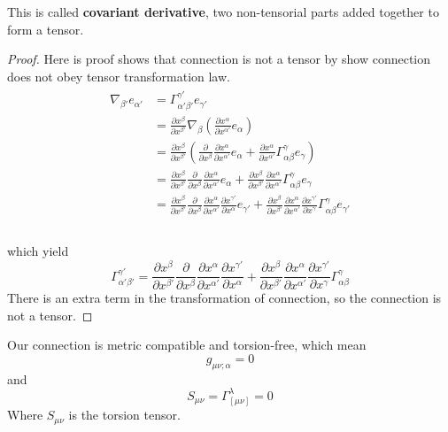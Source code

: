 \documentclass[12pt]{article}
\theoremstyle{mystyle}{\newtheorem{definition}{Definition}[section]}
\theoremstyle{mystyle}{\newtheorem{theorem}[definition]{Theorem}}
\theoremstyle{mystyle}{\newtheorem*{remark}{Remark}}
\theoremstyle{mystyle}{\newtheorem*{example}{Example}}
\theoremstyle{mystyle}{\newtheorem*{examples}{Examples}}
\theoremstyle{cstyle}{\newtheorem*{cthm}{}}
\begin{document}
This is called \textbf{covariant derivative}, two non-tensorial parts added together to form a tensor.

\begin{proof}
  Here is proof shows that connection is not a tensor by show connection does not obey tensor transformation law.
  \begin{align*}
    \begin{split}
      \nabla_{\beta'}e_{\alpha'} & = \Gamma^{\gamma'}_{\alpha'\beta'}e_{\gamma'} \\
      &= \frac{\partial x^{\beta}}{\partial x^{\beta'}}\nabla_{\beta}(\frac{\partial x^{\alpha}}{\partial x^{\alpha'}}e_{\alpha})\\
      &= \frac{\partial x^{\beta}}{\partial x^{\beta'}}
      (\frac{\partial}{\partial x^{\beta}}\frac{\partial x^{\alpha}}{\partial x^{\alpha'}}e_{\alpha}
      + \frac{\partial x^{\alpha}}{\partial x^{\alpha'}} \Gamma ^{\gamma}_{\alpha\beta} e_{\gamma})\\
      &= \frac{\partial x^{\beta}}{\partial x^{\beta'}}
      \frac{\partial}{\partial x^{\beta}}\frac{\partial x^{\alpha}}{\partial x^{\alpha'}}e_{\alpha}
      + \frac{\partial x^{\beta}}{\partial x^{\beta'}}
      \frac{\partial x^{\alpha}}{\partial x^{\alpha'}} \Gamma ^{\gamma}_{\alpha\beta} e_{\gamma}\\
      &= \frac{\partial x^{\beta}}{\partial x^{\beta'}}
      \frac{\partial}{\partial x^{\beta}}\frac{\partial x^{\alpha}}{\partial x^{\alpha'}}\frac{\partial x^{\gamma'}}{\partial x^{\alpha}}e_{\gamma'}
      + \frac{\partial x^{\beta}}{\partial x^{\beta'}}
      \frac{\partial x^{\alpha}}{\partial x^{\alpha'}} \frac{\partial x^{\gamma'}}{\partial x^{\gamma}} \Gamma ^{\gamma}_{\alpha\beta}  e_{\gamma'}\\
    \end{split}
  \end{align*}
  \\
  which yield \[\Gamma^{\gamma'}_{\alpha'\beta'} = \frac{\partial x^{\beta}}{\partial x^{\beta'}}
    \frac{\partial}{\partial x^{\beta}}\frac{\partial x^{\alpha}}{\partial x^{\alpha'}}\frac{\partial x^{\gamma'}}{\partial x^{\alpha}}
    + \frac{\partial x^{\beta}}{\partial x^{\beta'}}
    \frac{\partial x^{\alpha}}{\partial x^{\alpha'}}
    \frac{\partial x^{\gamma'}}{\partial x^{\gamma}} \Gamma ^{\gamma}_{\alpha\beta}\]
  There is an extra term in the transformation of connection, so the connection is not a tensor.
\end{proof}
Our connection is metric compatible and torsion-free, which mean \[g_{\mu\nu;\alpha} = 0\] and\[S_{\mu\nu} = \Gamma_{[\mu\nu]}^{\lambda} = 0 \]
Where \(S_{\mu\nu}\) is the torsion tensor.
\end{document}
